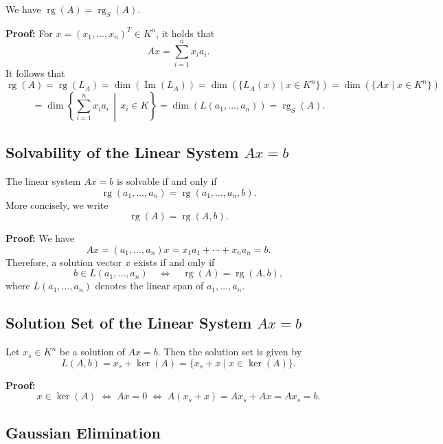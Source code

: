We have \(\operatorname{rg}(A) = \operatorname{rg}_S(A)\).

\textbf{Proof:} For \(x = (x_1, \ldots, x_n)^T \in K^n\), it holds that
\[
Ax = \sum_{i=1}^{n} x_i a_i.
\]
It follows that
\[
\operatorname{rg}(A) = \operatorname{rg}(L_A) = \dim(\operatorname{Im}(L_A))
= \dim\left(\{L_A(x) \mid x \in K^n\}\right)
= \dim\left(\{Ax \mid x \in K^n\}\right)
\]
\[
= \dim\left\{ \sum_{i=1}^{n} x_i a_i \,\middle|\, x_i \in K \right\}
= \dim(L(a_1, \ldots, a_n)) = \operatorname{rg}_S(A).
\]

\subsection{Solvability of the Linear System \(Ax = b\)}

The linear system \(Ax = b\) is solvable if and only if
\[
\operatorname{rg}(a_1, \ldots, a_n) = \operatorname{rg}(a_1, \ldots, a_n, b).
\]
More concisely, we write
\[
\operatorname{rg}(A) = \operatorname{rg}(A, b).
\]

\textbf{Proof:} We have
\[
Ax = (a_1, \ldots, a_n)x = x_1 a_1 + \cdots + x_n a_n = b.
\]
Therefore, a solution vector \(x\) exists if and only if
\[
b \in L(a_1, \ldots, a_n) \quad \Leftrightarrow \quad \operatorname{rg}(A) = \operatorname{rg}(A, b),
\]
where \(L(a_1, \ldots, a_n)\) denotes the linear span of \(a_1, \ldots, a_n\).

\subsection{Solution Set of the Linear System \(Ax = b\)}

Let \(x_s \in K^n\) be a solution of \(Ax = b\). Then the solution set is given by
\[
L(A, b) = x_s + \ker(A) = \{x_s + x \mid x \in \ker(A)\}.
\]

\textbf{Proof:}
\[
x \in \ker(A) \;\Leftrightarrow\; Ax = 0 \;\Leftrightarrow\; A(x_s + x) = Ax_s + Ax = Ax_s = b.
\]


\subsection{Gaussian Elimination}

